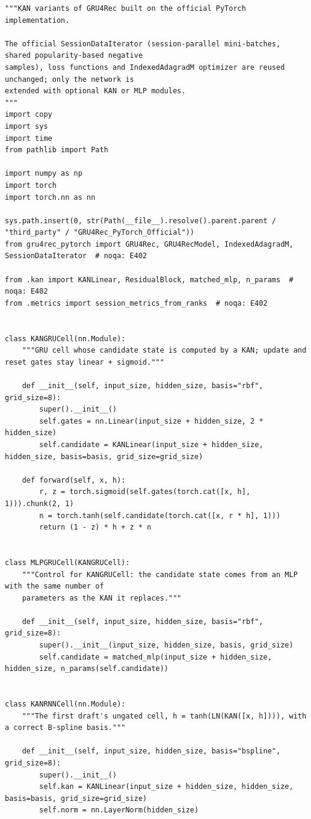 \documentclass[12pt,a4paper]{report}
\begin{document}
\begin{lstlisting}[style=pythonstyle, caption={KAN-GRU cell, draft cell and the extended GRU4Rec network (\texttt{kanrec/session.py}, first part).}]
"""KAN variants of GRU4Rec built on the official PyTorch implementation.

The official SessionDataIterator (session-parallel mini-batches, shared popularity-based negative
samples), loss functions and IndexedAdagradM optimizer are reused unchanged; only the network is
extended with optional KAN or MLP modules.
"""
import copy
import sys
import time
from pathlib import Path

import numpy as np
import torch
import torch.nn as nn

sys.path.insert(0, str(Path(__file__).resolve().parent.parent / "third_party" / "GRU4Rec_PyTorch_Official"))
from gru4rec_pytorch import GRU4Rec, GRU4RecModel, IndexedAdagradM, SessionDataIterator  # noqa: E402

from .kan import KANLinear, ResidualBlock, matched_mlp, n_params  # noqa: E402
from .metrics import session_metrics_from_ranks  # noqa: E402


class KANGRUCell(nn.Module):
    """GRU cell whose candidate state is computed by a KAN; update and reset gates stay linear + sigmoid."""

    def __init__(self, input_size, hidden_size, basis="rbf", grid_size=8):
        super().__init__()
        self.gates = nn.Linear(input_size + hidden_size, 2 * hidden_size)
        self.candidate = KANLinear(input_size + hidden_size, hidden_size, basis=basis, grid_size=grid_size)

    def forward(self, x, h):
        r, z = torch.sigmoid(self.gates(torch.cat([x, h], 1))).chunk(2, 1)
        n = torch.tanh(self.candidate(torch.cat([x, r * h], 1)))
        return (1 - z) * h + z * n


class MLPGRUCell(KANGRUCell):
    """Control for KANGRUCell: the candidate state comes from an MLP with the same number of
    parameters as the KAN it replaces."""

    def __init__(self, input_size, hidden_size, basis="rbf", grid_size=8):
        super().__init__(input_size, hidden_size, basis, grid_size)
        self.candidate = matched_mlp(input_size + hidden_size, hidden_size, n_params(self.candidate))


class KANRNNCell(nn.Module):
    """The first draft's ungated cell, h = tanh(LN(KAN([x, h]))), with a correct B-spline basis."""

    def __init__(self, input_size, hidden_size, basis="bspline", grid_size=8):
        super().__init__()
        self.kan = KANLinear(input_size + hidden_size, hidden_size, basis=basis, grid_size=grid_size)
        self.norm = nn.LayerNorm(hidden_size)


\end{lstlisting}
\end{document}
